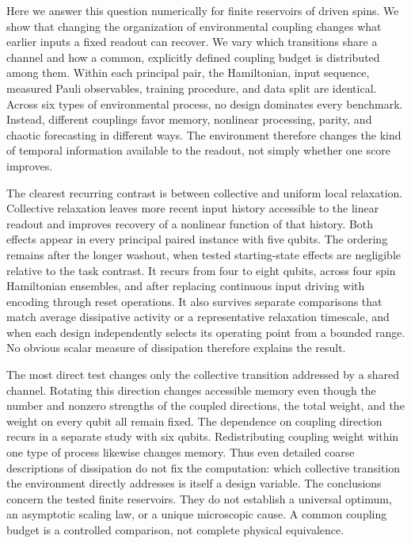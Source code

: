 Here we answer this question numerically for finite reservoirs of driven spins. We
show that changing the organization of environmental coupling changes what
earlier inputs a fixed readout can recover. We vary which transitions share a
channel and how a common, explicitly defined coupling budget is distributed
among them. Within each principal pair, the Hamiltonian, input sequence,
measured Pauli observables, training procedure, and data split are identical.
Across six types of environmental process, no design dominates every benchmark.
Instead, different couplings favor memory, nonlinear processing, parity, and
chaotic forecasting in different ways. The environment therefore changes the
kind of temporal information available to the readout, not simply whether one
score improves.

The clearest recurring contrast is between collective and uniform local relaxation.
Collective relaxation leaves more recent input history accessible to the linear
readout and improves recovery of a nonlinear function of that history. Both
effects appear in every principal paired instance with five qubits. The ordering
remains after the longer washout, when tested starting-state effects are
negligible relative to the task contrast.
It recurs from four to eight qubits, across four spin Hamiltonian ensembles, and
after replacing continuous input driving with encoding through reset operations. It also
survives separate comparisons that match average dissipative activity or a
representative relaxation timescale, and when each design independently selects
its operating point from a bounded range. No obvious scalar measure of
dissipation therefore explains the result.

The most direct test changes only the collective transition addressed by a
shared channel. Rotating this direction changes accessible memory even though
the number and nonzero strengths of the coupled directions, the total weight,
and the weight on every qubit all remain fixed. The dependence on coupling
direction recurs in a separate study with six qubits. Redistributing coupling weight
within one type of process likewise changes memory. Thus even detailed coarse
descriptions of dissipation do not fix the computation: which collective
transition the environment directly addresses is itself a design variable. The
conclusions concern the tested finite reservoirs. They do not establish a
universal optimum, an asymptotic scaling law, or a unique microscopic cause. A
common coupling budget is a controlled comparison, not complete physical
equivalence.

